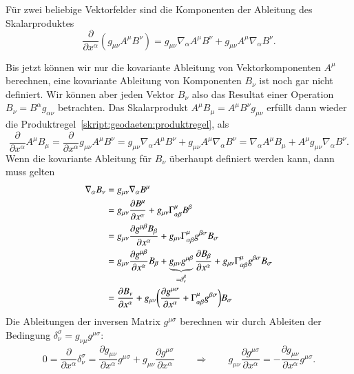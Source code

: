 \begin{satz}
Für zwei beliebige Vektorfelder sind die Komponenten der Ableitung
des Skalarproduktes 
\begin{equation}
\frac{\partial}{\partial x^\alpha}
(g_{\mu\nu}A^\mu B^\nu)
=
g_{\mu\nu}\nabla_\alpha A^\mu B^\nu
+
g_{\mu\nu}A^\mu\nabla_\alpha B^\nu.
\label{skript:geodaeten:produktregel}
\end{equation}
\end{satz}

Bis jetzt können wir nur die kovariante Ableitung von Vektorkomponenten
$A^\mu$ berechnen, eine kovariante Ableitung von Komponenten $B_\nu$
ist noch gar nicht definiert.
Wir können aber jeden Vektor $B_\nu$ also das Resultat einer Operation
$B_\nu=B^\alpha g_{\alpha\nu}$ betrachten.
Das Skalarprodukt $A^\mu B_\mu=A^\mu B^\nu g_{\mu\nu}$ erfüllt dann
wieder die Produktregel~\eqref{skript:geodaeten:produktregel},
als
\[
\frac{\partial}{\partial x^\alpha}A^\mu B_\mu
=
\frac{\partial}{\partial x^\alpha}g_{\mu\nu} A^\mu B^\nu
=
g_{\mu\nu} \nabla_\alpha A^\mu B^\nu
+
g_{\mu\nu} A^\mu \nabla_\alpha B^\nu
=
\nabla_\alpha A^\mu B_\mu
+
A^\mu g_{\mu\nu} \nabla_\alpha B^\nu.
\]
Wenn die kovariante Ableitung für $B_\nu$ überhaupt definiert werden 
kann, dann muss gelten
\begin{align}
\nabla_\alpha B_\nu
&=
g_{\mu\nu}\nabla_\alpha B^\mu
\notag
\\
&=
g_{\mu\nu}\frac{\partial B^\mu}{\partial x^\alpha}
+
g_{\mu\nu}\Gamma^\mu_{\alpha\beta}B^\beta
\notag
\\
&=
g_{\mu\nu}\frac{\partial g^{\mu\beta}B_\beta}{\partial x^\alpha}
+
g_{\mu\nu}\Gamma^\mu_{\alpha\beta}g^{\beta\sigma}B_\sigma
\notag
\\
&=
g_{\mu\nu}\frac{\partial g^{\mu\beta}}{\partial x^\alpha} B_\beta
+
\underbrace{g_{\mu\nu}g^{\mu\beta}}_{=\delta_\nu^\beta}\frac{\partial B_\beta}{\partial x^\alpha}
+
g_{\mu\nu}\Gamma^\mu_{\alpha\beta}g^{\beta\sigma}B_\sigma
\notag
\\
&=
\frac{\partial B_\nu}{\partial x^\alpha}
+
g_{\mu\nu}\biggl(
\frac{\partial g^{\mu\sigma}}{\partial x^\alpha}
+\Gamma^\mu_{\alpha\beta}g^{\beta\sigma}
\biggr)B_\sigma
\label{skript:geodaeten:kovkov1}
\end{align}
Die Ableitungen der inversen Matrix $g^{\mu\sigma}$ berechnen wir
durch Ableiten der Bedingung $\delta_\nu^\sigma=g_{\nu\mu}g^{\mu\sigma}$:
\begin{equation}
0
=
\frac{\partial}{\partial x^\alpha}\delta_\nu^\sigma
=
\frac{\partial g_{\mu\nu}}{\partial x^\alpha} g^{\mu\sigma}
+
g_{\mu\nu}
\frac{\partial g^{\mu\sigma}}{\partial x^\alpha}
\qquad\Rightarrow\qquad
g_{\mu\nu}
\frac{\partial g^{\mu\sigma}}{\partial x^\alpha}
=
-
\frac{\partial g_{\mu\nu}}{\partial x^\alpha} g^{\mu\sigma}.
\label{skript:geodaeten:ginvabl}
\end{equation}
